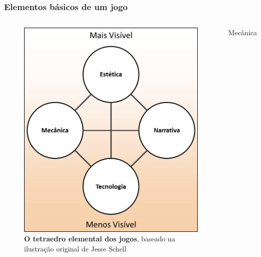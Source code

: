 \expandafter\documentclass\expandafter[table, usenames, svgnames, dvipsnames, \classopts]{beamer}
\begin{document}
\begin{frame}
	\frametitle{\textbf{Elementos básicos de um jogo}}

	\begin{columns}[c]
	
		
		    \vspace{-2em}
		
			\begin{figure}
			    \centering
		        \includegraphics[height=0.65\paperheight]{game-elements}
		        \vspace{0.5em}
		        \caption{\textbf{O tetraedro elemental dos jogos}, baseado na ilustração original de Jesse Schell}
		    \end{figure}
		    
		
		    \vspace{-1em}
		
			\begin{outline}
				\1 Mecânica


\end{outline}
\end{columns}
\end{frame}
\end{document}
